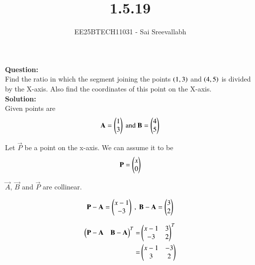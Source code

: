 \documentclass[journal]{IEEEtran}
\begin{document}

\vspace{3cm}

\title{1.5.19}
\author {EE25BTECH11031 - Sai Sreevallabh}
{\let\newpage\relax\maketitle}

\renewcommand{\thefigure}{\theenumi}
\renewcommand{\thetable}{\theenumi}
\setlength{\intextsep}{10pt} %


\renewcommand{\thetable}{\theenumi}

\textbf{Question: }\\

Find the ratio in which the segment joining the points $\left(1,3\right)$ and $\left(4,5\right)$ is divided by the X-axis. Also find the coordinates of this point on the X-axis.\\ 

\textbf{Solution: }\\

Given points are\\
\begin{align}
    \mathbf{A}=\begin{pmatrix}1\\3\end{pmatrix} \ \text{and}\  \mathbf{B}=\begin{pmatrix}4\\5\end{pmatrix}
\end{align}

Let $\vec{P}$ be a point on the x-axis. We can assume it to be\\

\begin{align}
    \mathbf{P}=\begin{pmatrix}x\\0\end{pmatrix}
\end{align}

$\vec{A}$, $\vec{B}$ and $\vec{P}$ are collinear. 

\begin{align}
    \vec{P}-\vec{A}=\myvec{x-1 \\ -3} \ , \ 
    \vec{B}-\vec{A}=\myvec{3\\2}  
\end{align}

\begin{align}
    \begin{pmatrix}\mathbf{P}-\mathbf{A} & \mathbf{B}-\mathbf{A}\end{pmatrix}^T =& \begin{pmatrix}x-1 & 3\\ -3 & 2\end{pmatrix}^T\\
    =& \begin{pmatrix}x-1 & -3 \\ 3 & 2\end{pmatrix}
\end{align}
\end{document}
